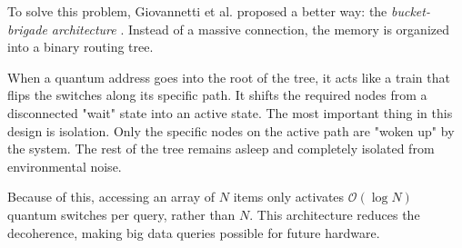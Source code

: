 To solve this problem, Giovannetti et al. proposed a better way: the \textit{bucket-brigade architecture} \cite{giovannetti2008}. 
Instead of a massive connection, the memory is organized into a binary routing tree.

When a quantum address goes into the root of the tree, it acts like a train that flips the switches along its specific path. 
It shifts the required nodes from a disconnected "wait" state into an active state. 
The most important thing in this design is isolation. 
Only the specific nodes on the active path are "woken up" by the system. 
The rest of the tree remains asleep and completely isolated from environmental noise. 

Because of this, accessing an array of $N$ items only activates $\mathcal{O}(\log N)$ quantum switches per query, rather than $N$. 
This architecture reduces the decoherence, making big data queries possible for future hardware.